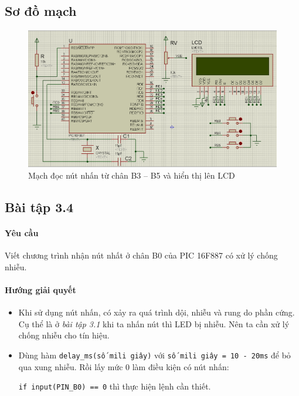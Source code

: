 \subsection*{Sơ đồ mạch}
\begin{figure}[!h]
\begin{center}
\includegraphics[scale=0.4]{bai-3/image/BAI-3-3}
\end{center}
\caption{Mạch đọc nút nhấn từ chân B3 -- B5 và hiển thị lên LCD}
\end{figure}
\subsection{Bài tập 3.4}\label{Ex:3-4}
\paragraph{Yêu cầu}Viết chương trình nhận nút nhất ở chân B0 của PIC 16F887 có xử lý chống nhiễu.
\paragraph{Hướng giải quyết}
\begin{itemize}
\item Khi sử dụng nút nhấn, có xảy ra quá trình dội, nhiễu và rung do phần cứng. Cụ thể là ở \emph{bài tập 3.1} khi ta nhấn nút thì LED bị nhiễu. Nên ta cần xử lý chống nhiễu cho tín hiệu.
\item Dùng hàm \verb|delay_ms(số mili giây)| với \verb|số mili giây = 10 - 20ms| để bỏ qua xung nhiễu. Rồi lấy mức 0 làm điều kiện có nút nhấn:

\verb|if input(PIN_B0) == 0| thì thực hiện lệnh cần thiết.
\end{itemize}
